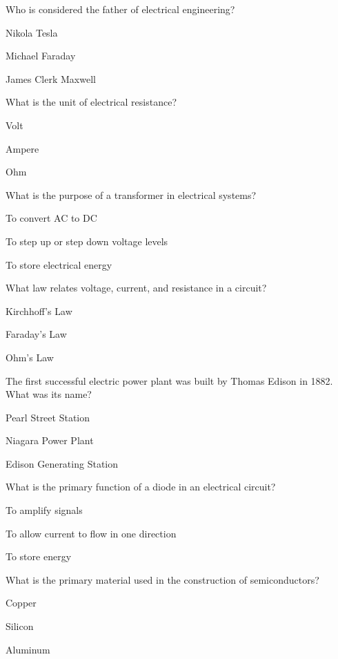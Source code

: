 
\begin{enhancedmcq}{Who is considered the father of electrical engineering?}
\item Nikola Tesla
\item Michael Faraday
\item James Clerk Maxwell

\end{enhancedmcq}
\begin{enhancedmcq}{What is the unit of electrical resistance?}
\item Volt
\item Ampere
\item Ohm

\end{enhancedmcq}
\begin{enhancedmcq}{What is the purpose of a transformer in electrical systems?}
\item To convert AC to DC
\item To step up or step down voltage levels
\item To store electrical energy

\end{enhancedmcq}
\begin{enhancedmcq}{What law relates voltage, current, and resistance in a circuit?}
\item Kirchhoff's Law
\item Faraday's Law
\item Ohm's Law

\end{enhancedmcq}
\begin{enhancedmcq}{The first successful electric power plant was built by Thomas Edison in 1882. What was its name?}
\item Pearl Street Station
\item Niagara Power Plant
\item Edison Generating Station

\end{enhancedmcq}
\begin{enhancedmcq}{What is the primary function of a diode in an electrical circuit?}
\item To amplify signals
\item To allow current to flow in one direction
\item To store energy

\end{enhancedmcq}
\begin{enhancedmcq}{What is the primary material used in the construction of semiconductors?}
\item Copper
\item Silicon
\item Aluminum

\end{enhancedmcq}
